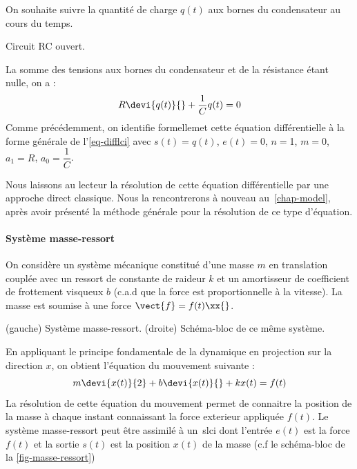 On souhaite suivre la quantité de charge $q(t)$ aux bornes du condensateur au 
cours du temps.
\begin{marginfigure}[-8em]   
    \centering
    
    \caption{Circuit RC ouvert.\label{fig-decharge_condensateur}}
\end{marginfigure}
La somme des tensions aux bornes du condensateur et de la résistance 
étant nulle, on a :
\begin{align*}
    R\devi{q(t)}{}+\dfrac{1}{C}q(t)=0 
\end{align*}
Comme précédemment, on identifie formellemet cette équation différentielle 
à la forme générale de l'\cref{eq-difflci} avec $s(t)=q(t)$, $e(t)=0$, 
$n=$1, $m=0$, $a_1=R$, $a_0=\dfrac{1}{C}$.

Nous laissons au lecteur la résolution de cette équation différentielle 
par une approche direct classique.
Nous la rencontrerons à nouveau au~\cref{chap-model}, après avoir 
présenté la méthode générale pour la résolution de ce type d'équation.
\paragraph{Système masse-ressort}
On considère un système mécanique constitué d'une masse $m$ en translation 
couplée avec un ressort de constante
de raideur $k$ et un amortisseur de coefficient de frottement 
visqueux $b$ (c.a.d que la force est 
proportionnelle à la vitesse). 
La masse est soumise à une force $\vect{f}=f(t)\xx{}$.
\begin{marginfigure}[-8em]
    \centering
    
    \caption{(gauche) Système masse-ressort. (droite) Schéma-bloc de ce même 
    système.
    \label{fig-masse-ressort}}
\end{marginfigure}
En appliquant le principe fondamentale de la dynamique en projection 
sur la direction $x$, on obtient l'équation du mouvement suivante :
\[
m\devi{x(t)}{2}+b\devi{x(t)}{}+kx(t)=f(t)
\]
\newpage
\restoregeometry
\captionsetup{width=0.9\linewidth}
La résolution de cette équation du mouvement permet de connaitre la position 
de la masse à chaque instant connaissant la force exterieur 
appliquée $f(t)$. Le système masse-ressort peut être assimilé à un~\gls{slci} 
dont l'entrée $e(t)$ est la force $f(t)$ et la sortie $s(t)$ est la 
position $x(t)$ de la masse (c.f le schéma-bloc de la \cref{fig-masse-ressort})


